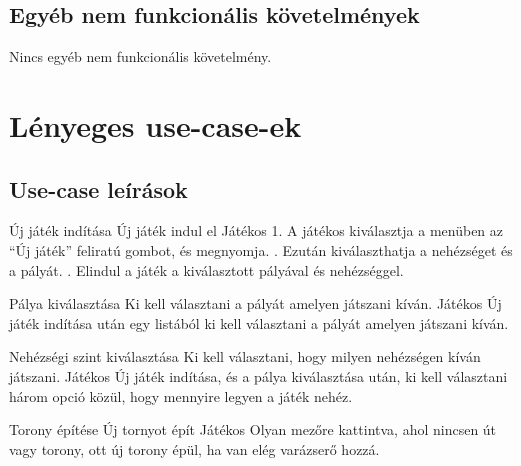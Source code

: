 \subsection{Egyéb nem funkcionális követelmények}

Nincs egyéb nem funkcionális követelmény.



\section{Lényeges use-case-ek}

\subsection{Use-case leírások}

\usecase
{Új játék indítása}
{Új játék indul el}
{Játékos}
{1. A játékos kiválasztja a menüben az ``Új játék'' feliratú gombot, és megnyomja. . Ezután kiválaszthatja  a nehézséget és a pályát. . Elindul a játék a kiválasztott pályával és nehézséggel.}

\usecase
{Pálya kiválasztása}
{Ki kell választani a pályát amelyen játszani kíván.}
{Játékos}
{Új játék indítása után egy listából ki kell választani a pályát amelyen játszani kíván.}

\usecase
{Nehézségi szint kiválasztása}
{Ki kell választani, hogy milyen nehézségen kíván játszani.}
{Játékos}
{Új játék indítása, és a pálya kiválasztása után, ki kell választani három opció közül,
 hogy mennyire legyen a játék nehéz.}

\usecase
{Torony építése}
{Új tornyot épít}
{Játékos}
{Olyan mezőre kattintva, ahol nincsen út vagy torony, ott új torony épül,
ha van elég varázserő hozzá.}


